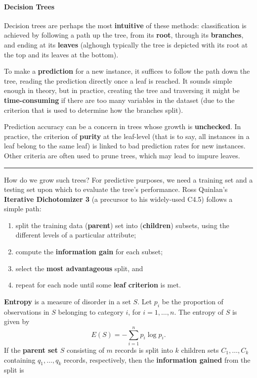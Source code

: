 \paragraph{Decision Trees}
Decision trees are perhaps the most \textbf{intuitive} of these methods: classification is achieved by following a path up the tree, from its \textbf{root}, through its \textbf{branches}, and ending at its \textbf{leaves} (alghough typically the tree is depicted with its root at the top and its leaves at the bottom). \par To make a \textbf{prediction} for a new instance, it suffices to follow the path down the tree, reading the prediction directly once a leaf is reached. It sounds simple enough in theory, but in practice, creating the tree and traversing it might be \textbf{time-consuming} if there are too many variables in the dataset (due to the criterion that is used to determine how the branches split). 
\par Prediction accuracy can be a concern in trees whose growth is \textbf{unchecked}. In practice, the criterion of \textbf{purity} at the leaf-level (that is to say, all instances in a leaf belong to the same leaf) is linked to bad prediction rates for new instances. Other criteria are often used to prune trees, which may lead to impure leaves.
\begin{center}
    \rule{0.5\textwidth}{.4pt}
\end{center} 
How do we grow such trees? For predictive purposes, we need a training set and a testing set upon which to evaluate the tree's performance. Ross Quinlan's \textbf{Iterative Dichotomizer 3} (a precursor to his widely-used C4.5) follows a simple path: 
\begin{enumerate}[noitemsep]
\item split the training data (\textbf{parent}) set into (\textbf{children}) subsets, using the different levels of a particular attribute;
\item compute the \textbf{information gain} for each subset;
\item select the \textbf{most advantageous} split, and 
\item repeat for each node until some \textbf{leaf criterion} is met. 
\end{enumerate}
\textbf{Entropy} is a measure of disorder in a set $S$. Let $p_i$ be the proportion of observations in $S$ belonging to category $i$, for $i=1,\ldots, n$. The entropy of $S$ is given by $$E(S)=-\sum_{i=1}^n p_i\log p_i.$$
If the \textbf{parent set} $S$ consisting of $m$ records is split into $k$ children sets $C_1,\ldots, C_k$ containing $q_1, \ldots, q_k$ records, respectively, then the \textbf{information gained} from the split is  
